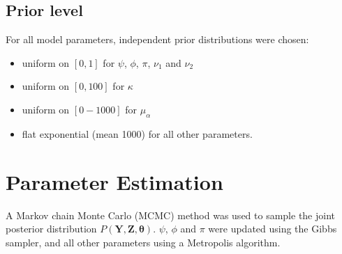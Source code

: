 \documentclass[10pt]{article}
\begin{document}
% 






\subsection*{Prior level}


For all model parameters, independent prior distributions were chosen: 
\begin{itemize}
	\item uniform on $[0,1]$ for $\psi$, $\phi$, $\pi$, $\nu_1$ and $\nu_2$
	\item uniform on $[0,100]$ for $\kappa$ 
	\item uniform on $[0-1000]$ for $\mu_{\alpha}$
	\item flat exponential (mean 1000) for all other parameters. 
\end{itemize}

  
\section*{Parameter Estimation}

A Markov chain Monte Carlo (MCMC) method was used to sample the joint
posterior distribution $P\left(\bm{Y},\bm{Z},\bm{\theta}\right)$.
$\psi$, $\phi$ and $\pi$ were updated using the Gibbs sampler, and all other parameters using a Metropolis algorithm.
\end{document}
